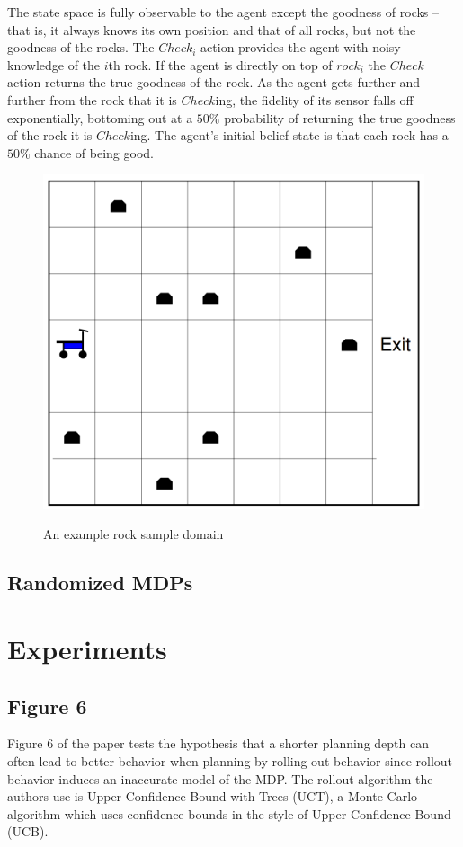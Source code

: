 \documentclass[11pt]{article} %
\begin{document}
The state space is fully observable to the agent except the goodness of rocks -- that is, it always knows its own position and that of all rocks, but not the goodness of the rocks. The $Check_i$ action provides the agent with noisy knowledge of the $i$th rock. If the agent is directly on top of $rock_i$ the $Check$ action returns the true goodness of the rock. As the agent gets further and further from the rock that it is $Check$ing, the fidelity of its sensor falls off exponentially, bottoming out at a $50\%$ probability of returning the true goodness of the rock it is $Check$ing. The agent's initial belief state is that each rock has a $50\%$ chance of being good.

\begin{figure}[h]
\label{fig: RockSample}
\centering
\includegraphics[page=1,width=.42\textwidth]{rock_sample_domain.png} \\
\caption{An example rock sample domain}
\end{figure}

\subsection{Randomized MDPs}


\section{Experiments}
\subsection{Figure 6}
Figure 6 of the paper tests the hypothesis that a shorter planning depth can often lead to better behavior when planning by rolling out behavior since rollout behavior induces an inaccurate model of the MDP. The rollout algorithm the authors use is Upper Confidence Bound with Trees (UCT), a Monte Carlo algorithm which uses confidence bounds in the style of Upper Confidence Bound (UCB).
\end{document}
